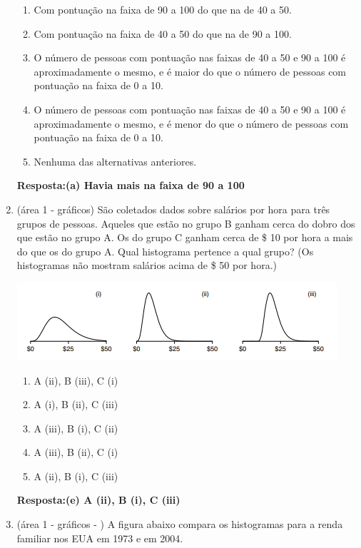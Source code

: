 \documentclass[12pt]{article}\documentclass[brazilian,12pt,a4paper,final]{article}
\begin{document}
\begin{enumerate}
\begin{enumerate}[label=(\alph*)]
\item Com pontuação na faixa de 90 a 100 do que na de 40 a 50.
\item Com pontuação na faixa de 40 a 50 do que na de 90 a 100.
\item O número de pessoas com pontuação nas faixas de 40 a 50 e 90 a 100 é aproximadamente o mesmo, e é maior do que o número de pessoas com pontuação na faixa de 0 a 10.
\item O número de pessoas com pontuação nas faixas de 40 a 50 e 90 a 100 é aproximadamente o mesmo, e é menor do que o número de pessoas com pontuação na faixa de 0 a 10.
\item Nenhuma das alternativas anteriores.

\end{enumerate}


\textbf{Resposta:(a) Havia mais na faixa de 90 a 100}

\item (área 1 - gráficos)
São coletados dados sobre salários por hora para três grupos de pessoas. Aqueles que estão
no grupo B ganham
cerca do dobro dos que estão no grupo A. Os do grupo C ganham
cerca de \$ 10 por hora a mais do que os do grupo A. Qual histograma pertence a qual
grupo? (Os histogramas não mostram salários acima de \$ 50 por hora.)

 \includegraphics{Figuras/3A7.png}
 
 \begin{enumerate}[label=(\alph*)]
\item A (ii), B (iii), C (i)
\item A (i), B (ii), C (iii)
\item A (iii), B (i), C (ii)
\item A (iii), B (ii), C (i)
\item A (ii), B (i), C (iii)
 \end{enumerate}
 
\textbf{Resposta:(e) A (ii), B (i), C (iii)}

\item (área 1 - gráficos - ) A figura abaixo compara os histogramas para a renda familiar nos EUA em 1973
e em 2004. 


\end{enumerate}
\end{document}
